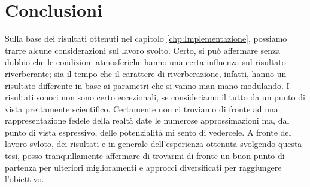 
\chapter{Conclusioni}
\label{chp:Conclusioni}
Sulla base dei risultati ottenuti nel capitolo \ref{chp:Implementazione}, possiamo trarre alcune
considerazioni sul lavoro svolto.
Certo, si può affermare senza dubbio che le condizioni atmosferiche hanno una certa
influenza sul risultato riverberante; sia il tempo che il carattere di riverberazione, infatti, hanno un
risultato differente in base ai parametri che si vanno man mano modulando. I risultati sonori
non sono certo eccezionali, se consideriamo il tutto da un punto di vista prettamente scientifico.
Certamente non ci troviamo di fronte ad una rappresentazione fedele della realtà date le numerose
approssimazioni ma, dal punto di vista espressivo, delle potenzialità mi sento di vedercele. A fronte
del lavoro svloto, dei risultati e in generale dell'esperienza ottenuta svolgendo questa tesi,
posso tranquillamente affermare di trovarmi di fronte un buon punto di partenza per ulteriori
miglioramenti e approcci diversificati per raggiungere l'obiettivo.

